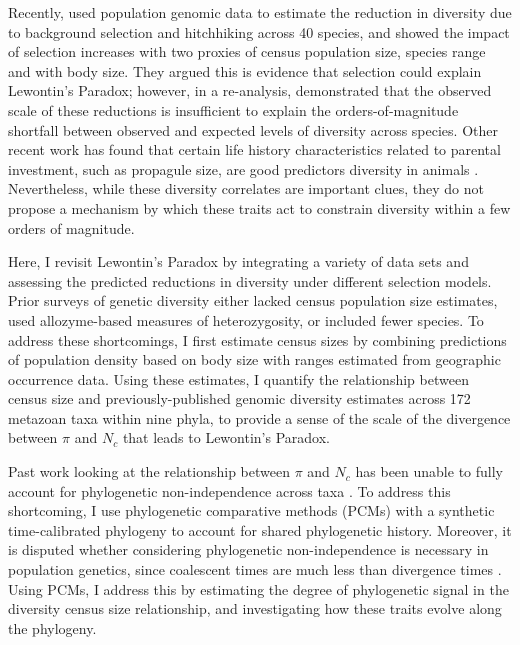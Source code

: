 \documentclass[9pt,lineno]{elife}
\begin{document}
Recently, \cite{Corbett-Detig2015-gt} used population genomic data to
estimate the reduction in diversity due to background selection and hitchhiking
across 40 species, and showed the impact of selection increases with two
proxies of census population size, species range and with body size. They
argued this is evidence that selection could explain Lewontin's Paradox;
however, in a re-analysis, \cite{Coop2016-gx} demonstrated that the
observed scale of these reductions is insufficient to explain the
orders-of-magnitude shortfall between observed and expected levels of diversity
across species. Other recent work has found that certain life history
characteristics related to parental investment, such as propagule size, are
good predictors diversity in animals \citep{Romiguier2014-bp,Chen2017-nf}.
Nevertheless, while these diversity correlates are important clues, they do not
propose a mechanism by which these traits act to constrain diversity within a
few orders of magnitude. 

Here, I revisit Lewontin's Paradox by integrating a variety of data sets and
assessing the predicted reductions in diversity under different selection
models. Prior surveys of genetic diversity either lacked census population size
estimates, used allozyme-based measures of heterozygosity, or included fewer
species. To address these shortcomings, I first estimate census sizes by
combining predictions of population density based on body size with ranges
estimated from geographic occurrence data. Using these estimates, I quantify
the relationship between census size and previously-published genomic diversity
estimates across 172 metazoan taxa within nine phyla, to provide a sense of the
scale of the divergence between $\pi$ and $N_c$ that leads to Lewontin's
Paradox. 

Past work looking at the relationship between $\pi$ and $N_c$ has been unable
to fully account for phylogenetic non-independence across taxa
\citep{Felsenstein1985-an}. To address this shortcoming, I use phylogenetic
comparative methods (PCMs) with a synthetic time-calibrated phylogeny to
account for shared phylogenetic history. Moreover, it is disputed whether
considering phylogenetic non-independence is necessary in population genetics,
since coalescent times are much less than divergence times
\citep{Whitney2010-ud,Lynch2011-qv}. Using PCMs, I address this by
estimating the degree of phylogenetic signal in the diversity census size
relationship, and investigating how these traits evolve along the phylogeny.
\end{document}
